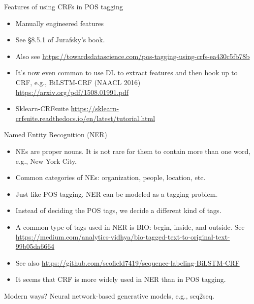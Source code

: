 \documentclass[11pt, handout]{beamer}
\begin{document}
\begin{frame}{Features of using CRFs in POS tagging}
  \begin{itemize}[<+->]
    \item Manually engineered features 
    \item See \S 8.5.1 of Jurafsky's book. 
    \item Also see  \url{https://towardsdatascience.com/pos-tagging-using-crfs-ea430c5fb78b} 
    \item It's now even common to use DL to extract features and then hook up to CRF, e.g., BiLSTM-CRF (NAACL 2016) \url{https://arxiv.org/pdf/1508.01991.pdf}
    \item Sklearn-CRFsuite \url{https://sklearn-crfsuite.readthedocs.io/en/latest/tutorial.html}
  \end{itemize}  
\end{frame}

\begin{frame}{Named Entity Recognition (NER)}
  \begin{itemize}[<+->]
    \item  NEs are proper nouns. It is not rare for them to contain more than one word, e.g., New York City. 
    \item Common categories of NEs: organization, people, location, etc. 
    \item Just like POS tagging, NER can be modeled as a tagging problem. 
    \item Instead of deciding the POS tags, we decide a different kind of tags. 
    \item A common type of tags used in NER is BIO: begin, inside, and outside.  See \url{https://medium.com/analytics-vidhya/bio-tagged-text-to-original-text-99b05da6664}
    \item See also \url{https://github.com/scofield7419/sequence-labeling-BiLSTM-CRF}
    \item It seems that CRF is more widely used in NER than in POS tagging. 
  \end{itemize}
\end{frame}

\begin{frame}{Modern ways? }
   Neural network-based generative models, e.g., seq2seq. 
\end{frame}

\end{document}
